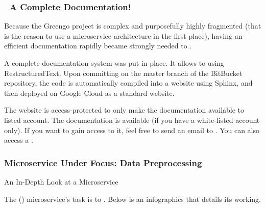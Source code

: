 \documentclass[letterpaper,10pt,english]{sphinxmanual}
\begin{document}
\subsubsection{📄 A Complete Documentation!}
\label{\detokenize{blog/2019/12/documentation:a-complete-documentation}}\label{\detokenize{blog/2019/12/documentation::doc}}
\begin{figure}[htbp]
\centering

\noindent{}
\end{figure}

Because the Greengo project is complex and purposefully highly fragmented (that is the reason to use a microservice architecture in the first place), having an efficient documentation rapidly became strongly needed to .

A complete documentation system was put in place. It allows to  using RestructuredText. Upon committing on the master branch of the BitBucket  repository, the code is automatically compiled into a website using Sphinx, and then deployed on Google Cloud as a standard website.

The website is access-protected to only make the documentation available to listed account. The documentation is available  (if you have a white-listed account only). If you want to gain access to it, feel free to send an email to . You can also access a .


\subsubsection{Microservice Under Focus: Data Preprocessing}
\label{\detokenize{blog/2019/12/data_preprocessing:microservice-under-focus-data-preprocessing}}\label{\detokenize{blog/2019/12/data_preprocessing::doc}}
An In-Depth Look at a Microservice

The  () microservice’s task is to . Below is an infographics that details its working.
\end{document}
